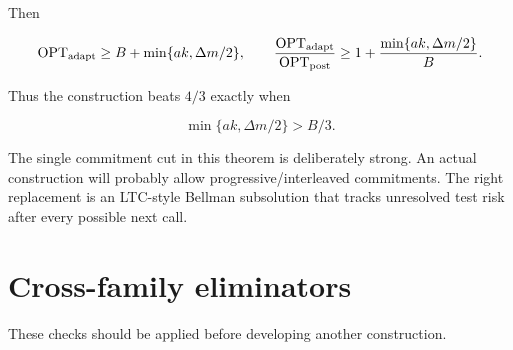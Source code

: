 \documentclass[11pt,a4paper]{article}
\begin{document}
Then


\[
 \operatorname{OPT}_{\rm adapt}
 \ge B+\min\{ak,\Delta m/2\},
\qquad
 \frac{\operatorname{OPT}_{\rm adapt}}
      {\operatorname{OPT}_{\rm post}}
 \ge
 1+\frac{\min\{ak,\Delta m/2\}}{B}.
\]

Thus the construction beats \(4/3\) exactly when


\[
 \min\{ak,\Delta m/2\}>B/3.
\]

The single commitment cut in this theorem is deliberately strong.  An actual construction will probably allow progressive/interleaved commitments.  The right replacement is an LTC-style Bellman subsolution that tracks unresolved test risk after every possible next call.


\section*{Cross-family eliminators}

These checks should be applied before developing another construction.
\end{document}
